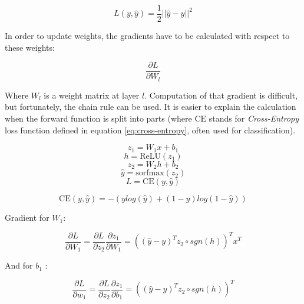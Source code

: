 \begin{equation}
    L(y,\hat{y}) = \frac{1}{2} || \hat{y} - y  ||^2
\end{equation}

In order to update weights, the gradients have to be calculated with respect to these weights:

\begin{equation}
    \frac{\partial L}{\partial W_l}
\end{equation}

Where $W_l$ is a weight matrix at layer $l$. Computation of that gradient is difficult, but fortunately, the chain rule can be used. It is easier to explain the calculation when the forward function is split into parts (where $\text{CE}$ stands for \textit{Cross-Entropy} loss function defined in equation \ref{eq:cross-entropy}, often used for classification).

\begin{equation}
    z_1 = W_1x + b_1
\end{equation}
\begin{equation}\label{eq:activation-relu}
    h = \text{ReLU}(z_1)
\end{equation}
\begin{equation}
    z_2 = W_2h + b_2
\end{equation}
\begin{equation}
    \hat{y} = \text{sorfmax}(z_2)
\end{equation}
\begin{equation}
    L = \text{CE}(y, \hat{y})
\end{equation}

\begin{equation}\label{eq:cross-entropy}
    \text{CE}(y, \hat{y}) = -(y log(\hat{y}) + (1-y)log(1-\hat{y}))
\end{equation}


Gradient for $W_1$:

\begin{equation}
    \frac{\partial L}{\partial W_1} = \frac{\partial L}{\partial z_2}\frac{\partial z_1}{\partial W_1} = \left( (\hat{y} - y)^Tz_2 \circ sgn(h) \right)^T x^T
\end{equation}

And for $b_1$ :

\begin{equation}
    \frac{\partial L}{\partial w_1} = \frac{\partial L}{\partial z_2}\frac{\partial z_1}{\partial b_1} = \left( (\hat{y} - y)^Tz_2 \circ sgn(h) \right)^T
\end{equation}

